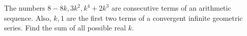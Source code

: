 The numbers $ 8-8k,3k^2,k^4+2k^3 $ are consecutive terms of an arithmetic sequence. Also, $ k,1 $ are the first two terms of a convergent infinite geometric series. Find the sum of all possible real $ k $.
